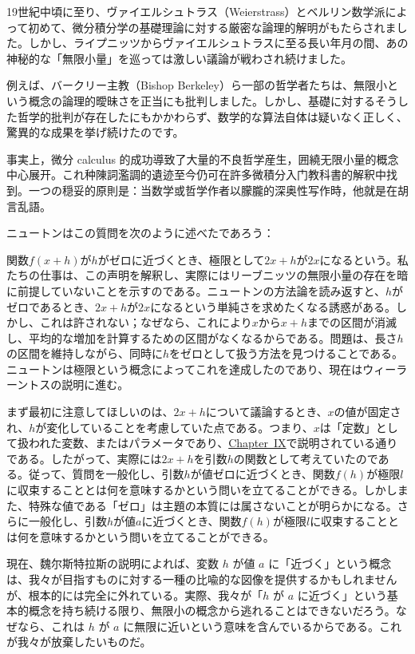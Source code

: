 \documentclass[a4paper,11pt,openany]{ltjsbook}
\providecommand{\ChapRef}[2][Chapter]{\hyperref[chapter:#2]{\Chg{#1}{Chapter}~#2}}
\providecommand{\Chg}[2]{#2}
\begin{document}
19世紀中頃に至り、ヴァイエルシュトラス（Weierstrass）とベルリン数学派によって初めて、微分積分学の基礎理論に対する厳密な論理的解明がもたらされました。しかし、ライプニッツからヴァイエルシュトラスに至る長い年月の間、あの神秘的な「無限小量」を巡っては激しい議論が戦わされ続けました。

例えば、バークリー主教（Bishop Berkeley）ら一部の哲学者たちは、無限小という概念の論理的曖昧さを正当にも批判しました。しかし、基礎に対するそうした哲学的批判が存在したにもかかわらず、数学的な算法自体は疑いなく正しく、驚異的な成果を挙げ続けたのです。

事実上，微分 calculus 的成功導致了大量的不良哲学産生，囲繞无限小量的概念中心展开。これ种陳詞濫調的遺迹至今仍可在許多微積分入门教科書的解釈中找到。一つの穏妥的原則是：当数学或哲学作者以朦朧的深奥性写作時，他就是在胡言乱語。

ニュートンはこの質問を次のように述べたであろう：

関数$f(x+h)$が$h$がゼロに近づくとき、極限として$2x + h$が$2x$になるという。私たちの仕事は、この声明を解釈し、実際にはリーブニッツの無限小量の存在を暗に前提していないことを示すのである。ニュートンの方法論を読み返すと、$h$がゼロであるとき、$2x + h$が$2x$になるという単純さを求めたくなる誘惑がある。しかし、これは許されない；なぜなら、これにより$x$から$x + h$までの区間が消滅し、平均的な増加を計算するための区間がなくなるからである。問題は、長さ$h$の区間を維持しながら、同時に$h$をゼロとして扱う方法を見つけることである。ニュートンは極限という概念によってこれを達成したのであり、現在はウィーラーントスの説明に進む。

まず最初に注意してほしいのは、$2x + h$について議論するとき、$x$の値が固定され、$h$が変化していることを考慮していた点である。つまり、$x$は「定数」として扱われた変数、またはパラメータであり、\ChapRef{IX}で説明されている通りである。したがって、実際には$2x + h$を引数$h$の関数として考えていたのである。従って、質問を一般化し、引数$h$が値ゼロに近づくとき、関数$f(h)$が極限$l$に収束することとは何を意味するかという問いを立てることができる。しかしまた、特殊な値である「ゼロ」は主題の本質には属さないことが明らかになる。さらに一般化し、引数$h$が値$a$に近づくとき、関数$f(h)$が極限$l$に収束することとは何を意味するかという問いを立てることができる。

現在、魏尔斯特拉斯の説明によれば、変数 $h$ が値 $a$ に「近づく」という概念は、我々が目指すものに対する一種の比喩的な図像を提供するかもしれませんが、根本的には完全に外れている。実際、我々が「$h$ が $a$ に近づく」という基本的概念を持ち続ける限り、無限小の概念から逃れることはできないだろう。なぜなら、これは $h$ が $a$ に無限に近いという意味を含んでいるからである。これが我々が放棄したいものだ。
\end{document}
